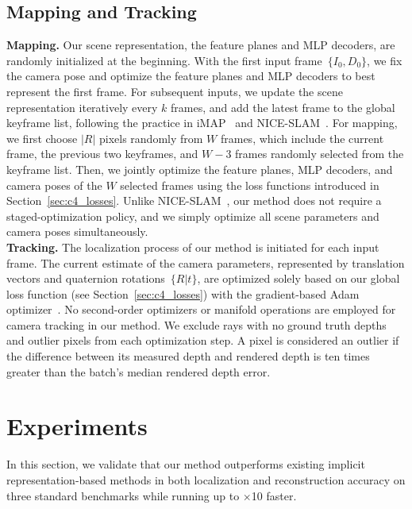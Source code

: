 \subsection{Mapping and Tracking} \label{sec:c4_map_track}
\noindent\textbf{Mapping.} Our scene representation, \ie the feature planes and MLP decoders, are randomly initialized at the beginning. With the first input frame~$\{I_{0}, D_{0}\}$, we fix the camera pose and optimize the feature planes and MLP decoders to best represent the first frame. For subsequent inputs, we update the scene representation iteratively every $k$ frames, and add the latest frame to the global keyframe list, following the practice in iMAP~\citep{sucar2021imap} and NICE-SLAM~\citep{zhu2022nice}. For mapping, we first choose $|R|$ pixels randomly from $W$ frames, which include the current frame, the previous two keyframes, and $W - 3$ frames randomly selected from the keyframe list. Then, we jointly optimize the feature planes, MLP decoders, and camera poses of the $W$ selected frames using the loss functions introduced in Section~\ref{sec:c4_losses}. Unlike NICE-SLAM~\citep{zhu2022nice}, our method does not require a staged-optimization policy, and we simply optimize all scene parameters and camera poses simultaneously. \\

\noindent\textbf{Tracking.} The localization process of our method is initiated for each input frame. The current estimate of the camera parameters, represented by translation vectors and quaternion rotations\citep{shoemake1985animating}~$\{R|t\}$, are optimized solely based on our global loss function (see Section~\ref{sec:c4_losses}) with the gradient-based Adam optimizer~\citep{adam}. No second-order optimizers or manifold operations are employed for camera tracking in our method. We exclude rays with no ground truth depths and outlier pixels from each optimization step. A pixel is considered an outlier if the difference between its measured depth and rendered depth is ten times greater than the batch's median rendered depth error.

\section{Experiments} \label{sec:c4_experiments}
In this section, we validate that our method outperforms existing implicit representation-based methods in both localization and reconstruction accuracy on three standard benchmarks while running up to $\times$10 faster.

